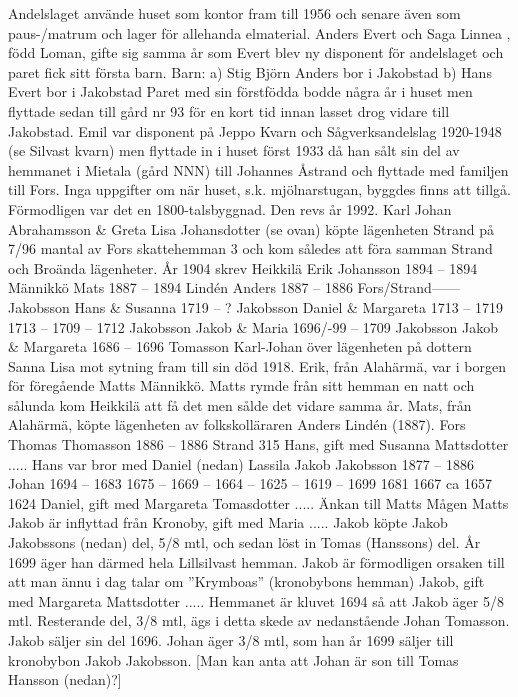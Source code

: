 Andelslaget använde huset som kontor fram till 1956 och senare även som paus-/matrum och lager för allehanda elmaterial.
Anders Evert  och Saga Linnea , född Loman, gifte sig samma år som Evert blev ny disponent för andelslaget och paret fick sitt första barn.
Barn: a) Stig Björn Anders  bor i Jakobstad
b) Hans Evert  bor i Jakobstad
Paret med sin förstfödda bodde några år i huset men flyttade sedan till gård nr 93 för en kort tid innan lasset drog vidare till Jakobstad.
Emil var disponent på Jeppo Kvarn och Sågverksandelslag 1920-1948 (se Silvast kvarn) men flyttade in i huset först 1933 då han sålt sin del av hemmanet i Mietala (gård NNN) till Johannes Åstrand och flyttade med familjen till Fors.
Inga uppgifter om när huset, s.k. mjölnarstugan, byggdes finns att tillgå. Förmodligen var det en 1800-talsbyggnad. Den revs år 1992.
Karl Johan Abrahamsson \& Greta Lisa Johansdotter (se ovan) köpte lägenheten Strand på 7/96 mantal av Fors skattehemman 3 och kom således att föra samman Strand och Broända lägenheter. År 1904 skrev
Heikkilä
Erik Johansson 1894 – 1894
Männikkö
Mats
1887 – 1894
Lindén
Anders 1887 – 1886
Fors/Strand------
Jakobsson
Hans \& Susanna 1719 – ?
Jakobsson
Daniel \& Margareta 1713 – 1719
1713 –
1709 – 1712
Jakobsson
Jakob \& Maria 1696/-99 – 1709
Jakobsson
Jakob \& Margareta 1686 – 1696
Tomasson
Karl-Johan över lägenheten på dottern Sanna Lisa mot sytning fram till sin död 1918.
Erik, från Alahärmä, var i borgen för föregående Matts Männikkö. Matts rymde från sitt hemman en natt och sålunda kom Heikkilä att få det men sålde det vidare samma år.
Mats, från Alahärmä, köpte lägenheten av folkskolläraren Anders Lindén (1887).
Fors
Thomas Thomasson 1886 – 1886
Strand 315
Hans, gift med Susanna Mattsdotter ..... Hans var bror med Daniel (nedan)
Lassila
Jakob Jakobsson 1877 – 1886
   Johan 1694 –
1683 1675 – 1669 – 1664 – 1625 – 1619 –
1699
1681
1667 ca 1657
1624
Daniel, gift med Margareta Tomasdotter .....
Änkan till Matts Mågen Matts
Jakob är inflyttad från Kronoby, gift med Maria .....
Jakob köpte Jakob Jakobssons (nedan) del, 5/8 mtl, och sedan löst in Tomas (Hanssons) del. År 1699 äger han därmed hela Lillsilvast hemman. Jakob är förmodligen orsaken till att man ännu i dag talar om ”Krymboas” (kronobybons hemman)
Jakob, gift med Margareta Mattsdotter .....
Hemmanet är kluvet 1694 så att Jakob äger 5/8 mtl. Resterande del, 3/8 mtl, ägs i detta skede av nedanstående Johan Tomasson. Jakob säljer sin del 1696.
Johan äger 3/8 mtl, som han år 1699 säljer till kronobybon Jakob Jakobsson. [Man kan anta att Johan är son till Tomas Hansson (nedan)?]
